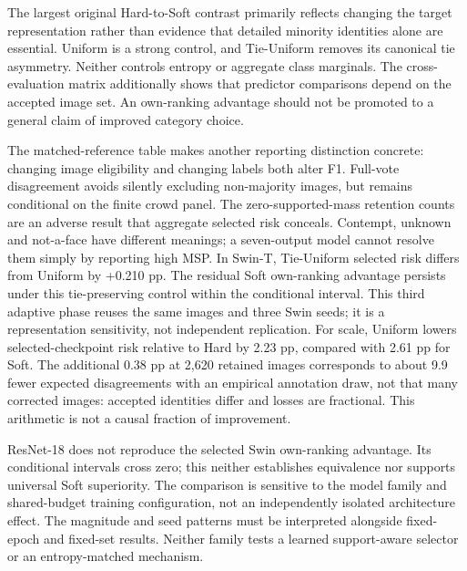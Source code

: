 The largest original Hard-to-Soft contrast primarily reflects changing the target representation rather than evidence that detailed minority identities alone are essential. Uniform is a strong control, and Tie-Uniform removes its canonical tie asymmetry. Neither controls entropy or aggregate class marginals. The cross-evaluation matrix additionally shows that predictor comparisons depend on the accepted image set. An own-ranking advantage should not be promoted to a general claim of improved category choice.

The matched-reference table makes another reporting distinction concrete: changing image eligibility and changing labels both alter F1. Full-vote disagreement avoids silently excluding non-majority images, but remains conditional on the finite crowd panel. The zero-supported-mass retention counts are an adverse result that aggregate selected risk conceals. Contempt, unknown and not-a-face have different meanings; a seven-output model cannot resolve them simply by reporting high MSP.
In Swin-T, Tie-Uniform selected risk differs from Uniform by +0.210 pp. The residual Soft own-ranking advantage persists under this tie-preserving control within the conditional interval. This third adaptive phase reuses the same images and three Swin seeds; it is a representation sensitivity, not independent replication.
For scale, Uniform lowers selected-checkpoint risk relative to Hard by 2.23 pp, compared with 2.61 pp for Soft. The additional 0.38 pp at 2,620 retained images corresponds to about 9.9 fewer expected disagreements with an empirical annotation draw, not that many corrected images: accepted identities differ and losses are fractional. This arithmetic is not a causal fraction of improvement.

ResNet-18 does not reproduce the selected Swin own-ranking advantage. Its conditional intervals cross zero; this neither establishes equivalence nor supports universal Soft superiority. The comparison is sensitive to the model family and shared-budget training configuration, not an independently isolated architecture effect. The magnitude and seed patterns must be interpreted alongside fixed-epoch and fixed-set results. Neither family tests a learned support-aware selector or an entropy-matched mechanism.
